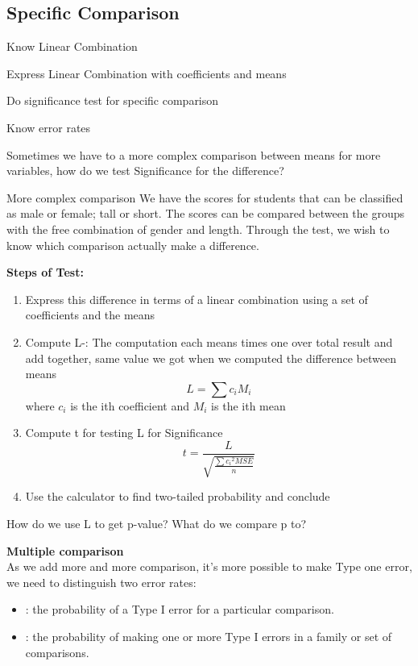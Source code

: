 \subsection{Specific Comparison}
\begin{objectives}
    \item Know Linear Combination
    \item Express Linear Combination with coefficients and means
    \item Do significance test for specific comparison
    \item Know error rates 
\end{objectives}
\vbox{}

Sometimes we have to a more complex comparison between means for more variables, how do we test Significance for the difference?
\\
\begin{examplebox}{More complex comparison}
    We have the scores for students that can be classified as male or female; tall or short. The scores can be compared between the groups with the free combination of gender and length. Through the test, we wish to know which comparison actually make a difference.
\end{examplebox}
\vbox{}
 \textbf{Steps of Test:}
\begin{enumerate}
    \item Express this difference in terms of a linear combination
using a set of coefficients and the means
    \item Compute L-: The computation each means times one over total result and add together, same value we got when we computed the difference between means
    \begin{equation}
        L=\sum c_iM_i
    \end{equation}
    where \(c_i\) is the ith coefficient and \(M_i\) is the ith mean
    \item Compute t for testing L for Significance
    \begin{equation}
        t=\frac{L}{\sqrt{\frac{\sum {c_i}^2 MSE}{n}}}
    \end{equation}
    \item Use the calculator to find two-tailed probability and conclude
\end{enumerate}
\begin{Question}
    How do we use L to get p-value? What do we compare p to?
\end{Question}
\vbox{}
\textbf{Multiple comparison}
\\As we add more and more comparison, it's more possible to make Type one error, we need to distinguish two error rates:
\begin{itemize}
   \item {}: the probability of a Type I error for a particular comparison.
   \item {}: the probability of making one or more Type I errors in a family or set of comparisons.
\end{itemize}

